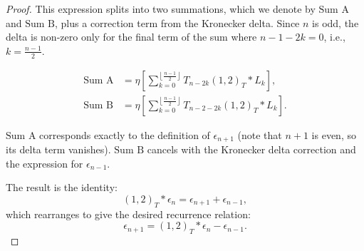 \documentclass[12pt]{article}
\begin{document}
\begin{proof}
This expression splits into two summations, which we denote by $\text{Sum A}$ and $\text{Sum B}$, plus a correction term from the Kronecker delta. Since $n$ is odd, the delta is non-zero only for the final term of the sum where $n - 1 - 2k = 0$, i.e., $k = \frac{n-1}{2}$.

\begin{align*}
\text{Sum A} &= \eta \left[ \sum_{k=0}^{\left\lfloor\frac{n-1}{2}\right\rfloor} T_{n - 2k}(1,2)_T \ast L_k \right], \\
\text{Sum B} &= \eta \left[ \sum_{k=0}^{\left\lfloor\frac{n-1}{2}\right\rfloor} T_{n - 2 - 2k}(1,2)_T \ast L_k \right].
\end{align*}

$\text{Sum A}$ corresponds exactly to the definition of $\epsilon_{n+1}$ (note that $n+1$ is even, so its delta term vanishes). $\text{Sum B}$ cancels with the Kronecker delta correction and the expression for $\epsilon_{n-1}$.

The result is the identity:
\[
(1,2)_T \ast \epsilon_n = \epsilon_{n+1} + \epsilon_{n-1},
\]
which rearranges to give the desired recurrence relation:
\[
\epsilon_{n+1} = (1,2)_T \ast \epsilon_n - \epsilon_{n-1}.
\]






\end{proof}
\end{document}
